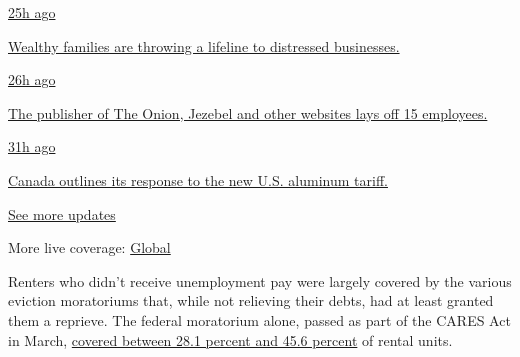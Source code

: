 \href{https://www.nytimes.com/live/2020/08/07/business/stock-market-today-coronavirus?action=click\&pgtype=Article\&state=default\&region=MAIN_CONTENT_1\&context=storylines_live_updates\#wealthy-families-are-throwing-a-lifeline-to-distressed-businesses}{25h
ago}

\href{https://www.nytimes.com/live/2020/08/07/business/stock-market-today-coronavirus?action=click\&pgtype=Article\&state=default\&region=MAIN_CONTENT_1\&context=storylines_live_updates\#wealthy-families-are-throwing-a-lifeline-to-distressed-businesses}{Wealthy
families are throwing a lifeline to distressed businesses.}

\href{https://www.nytimes.com/live/2020/08/07/business/stock-market-today-coronavirus?action=click\&pgtype=Article\&state=default\&region=MAIN_CONTENT_1\&context=storylines_live_updates\#the-publisher-of-the-onion-jezebel-and-other-websites-lays-off-15-employees}{26h
ago}

\href{https://www.nytimes.com/live/2020/08/07/business/stock-market-today-coronavirus?action=click\&pgtype=Article\&state=default\&region=MAIN_CONTENT_1\&context=storylines_live_updates\#the-publisher-of-the-onion-jezebel-and-other-websites-lays-off-15-employees}{The
publisher of The Onion, Jezebel and other websites lays off 15
employees.}

\href{https://www.nytimes.com/live/2020/08/07/business/stock-market-today-coronavirus?action=click\&pgtype=Article\&state=default\&region=MAIN_CONTENT_1\&context=storylines_live_updates\#canada-outlines-its-response-to-the-new-us-aluminum-tariff}{31h
ago}

\href{https://www.nytimes.com/live/2020/08/07/business/stock-market-today-coronavirus?action=click\&pgtype=Article\&state=default\&region=MAIN_CONTENT_1\&context=storylines_live_updates\#canada-outlines-its-response-to-the-new-us-aluminum-tariff}{Canada
outlines its response to the new U.S. aluminum tariff.}

\href{https://www.nytimes.com/live/2020/08/07/business/stock-market-today-coronavirus?action=click\&pgtype=Article\&state=default\&region=MAIN_CONTENT_1\&context=storylines_live_updates}{See
more updates}

More live coverage:
\href{https://www.nytimes.com/2020/08/07/world/covid-19-news.html?action=click\&pgtype=Article\&state=default\&region=MAIN_CONTENT_1\&context=storylines_live_updates}{Global}

Renters who didn't receive unemployment pay were largely covered by the
various eviction moratoriums that, while not relieving their debts, had
at least granted them a reprieve. The federal moratorium alone, passed
as part of the CARES Act in March,
\href{https://www.frbatlanta.org/community-development/publications/partners-update/2020/covid-19-publications/200616-housing-policy-impact-federal-eviction-protection-coverage-and-the-need-for-better-data.aspx}{covered
between 28.1 percent and 45.6 percent} of rental units.

